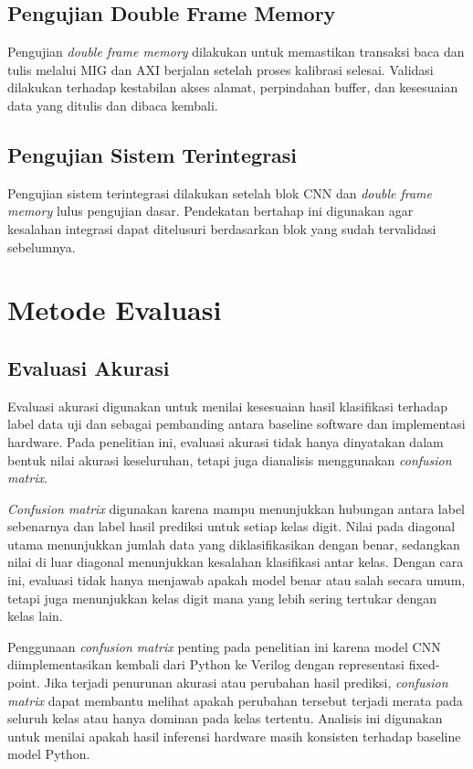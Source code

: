     \subsection{Pengujian Double Frame Memory}
	Pengujian \emph{double frame memory} dilakukan untuk memastikan transaksi
	baca dan tulis melalui MIG dan AXI berjalan setelah proses kalibrasi selesai.
	Validasi dilakukan terhadap kestabilan akses alamat, perpindahan buffer,
	dan kesesuaian data yang ditulis dan dibaca kembali.
    \subsection{Pengujian Sistem Terintegrasi}
	Pengujian sistem terintegrasi dilakukan setelah blok CNN dan \emph{double
	frame memory} lulus pengujian dasar. Pendekatan bertahap ini digunakan agar
	kesalahan integrasi dapat ditelusuri berdasarkan blok yang sudah
	tervalidasi sebelumnya.

\section{Metode Evaluasi}
    \subsection{Evaluasi Akurasi}
	Evaluasi akurasi digunakan untuk menilai kesesuaian hasil klasifikasi terhadap
	label data uji dan sebagai pembanding antara baseline software dan implementasi
	hardware. Pada penelitian ini, evaluasi akurasi tidak hanya dinyatakan dalam
	bentuk nilai akurasi keseluruhan, tetapi juga dianalisis menggunakan
	\emph{confusion matrix}.

	\emph{Confusion matrix} digunakan karena mampu menunjukkan hubungan antara
	label sebenarnya dan label hasil prediksi untuk setiap kelas digit. Nilai pada
	diagonal utama menunjukkan jumlah data yang diklasifikasikan dengan benar,
	sedangkan nilai di luar diagonal menunjukkan kesalahan klasifikasi antar kelas.
	Dengan cara ini, evaluasi tidak hanya menjawab apakah model benar atau salah
	secara umum, tetapi juga menunjukkan kelas digit mana yang lebih sering tertukar
	dengan kelas lain.

	Penggunaan \emph{confusion matrix} penting pada penelitian ini karena model CNN
	diimplementasikan kembali dari Python ke Verilog dengan representasi
	fixed-point. Jika terjadi penurunan akurasi atau perubahan hasil prediksi,
	\emph{confusion matrix} dapat membantu melihat apakah perubahan tersebut
	terjadi merata pada seluruh kelas atau hanya dominan pada kelas tertentu.
	Analisis ini digunakan untuk menilai apakah hasil inferensi hardware masih
	konsisten terhadap baseline model Python.
